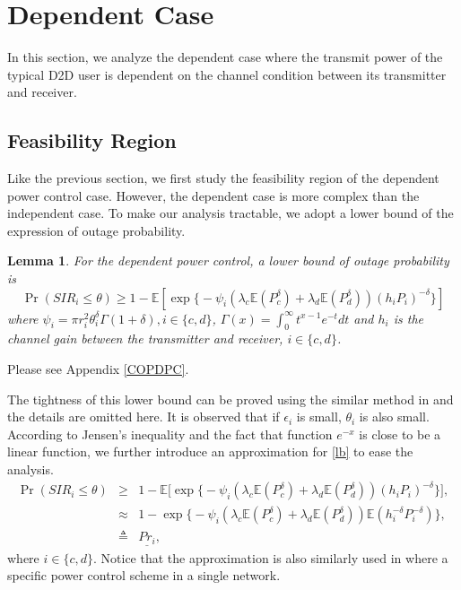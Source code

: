 \documentclass[12pt, draftclsnofoot, journal, letterpaper, onecolumn]{IEEEtran}
\newtheorem{lemma}{Lemma}[section]
\begin{document}
\section{Dependent Case}


In this section, we analyze the dependent case where the transmit power of the typical D2D
user is dependent on the channel condition between its transmitter and receiver.

\subsection{Feasibility Region}
Like the previous section, we first study the feasibility region of the dependent power control case. However, the dependent case is more complex than the independent case. To make our analysis tractable, we adopt a lower bound of the expression of outage probability.
\begin{lemma}\label{OPLB}
For the dependent power control, a lower bound of outage probability is
\begin{equation}\label{lb}
\Pr(SIR_i\leq\theta)\geq1-\mathbb{E}[\exp\big\{-\psi_i(\lambda_c\mathbb{E}(P_c^\delta)+\lambda_d\mathbb{E}(P_d^\delta))(h_iP_i)^{-\delta}\big\}]
\end{equation}
where $\psi_i=\pi r_i^2\theta_i^\delta\Gamma(1+\delta),i\in\{c,d\}$, $\Gamma(x)=\int_0^\infty t^{x-1}e^{-t}dt$ and $h_i$ is the channel gain between the transmitter and receiver, $i\in\{c,d\}$.
\end{lemma}

\begin{IEEEproof}
  Please see Appendix \ref{COPDPC}.
\end{IEEEproof}

The tightness of this lower bound can be proved using the similar method in \cite{TC2} and the details are omitted here.
It is observed that if $\epsilon_i$ is small, $\theta_i$ is also small. According to Jensen's inequality and the fact that function $e^{-x}$ is close to be a linear function, we further introduce an approximation for \eqref{lb} to ease the analysis.  \begin{eqnarray}
\Pr(SIR_i\leq\theta)&\geq&1-\mathbb{E}\big[\exp\big\{-\psi_i(\lambda_c\mathbb{E}(P_c^\delta)+\lambda_d\mathbb{E}(P_d^\delta))(h_iP_i)^{-\delta}\big\}\big],\nonumber\\
&\approx& 1-\exp\big\{-\psi_i(\lambda_c\mathbb{E}(P_c^\delta)+\lambda_d\mathbb{E}(P_d^\delta))\mathbb{E}(h_i^{-\delta}P_i^{-\delta})\big\},\label{approx}\\
&\triangleq&\underline{Pr_i},\nonumber
\end{eqnarray}
where $i\in\{c,d\}$. Notice that the approximation is also similarly used in \cite{FPC} where a specific power control scheme in a single network.
\end{document}

